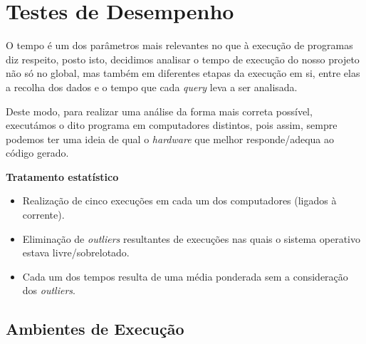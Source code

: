 \documentclass[12pt,a4paper]{report}
\begin{document}
\chapter{Testes de Desempenho}

O tempo é um dos parâmetros mais relevantes no que à execução de programas diz respeito, posto isto, decidimos analisar o tempo de execução do nosso projeto não só no global, mas também em diferentes etapas da execução em si, entre elas a recolha dos dados e o tempo que cada \textit{query} leva a ser analisada.

Deste modo, para realizar uma análise da forma mais correta possível, executámos o dito programa em computadores distintos, pois assim, sempre podemos ter uma ideia de qual o \textit{hardware} que melhor responde/adequa ao código gerado.


\normalsize\textbf{Tratamento estatístico}

\begin{itemize}
    
    \item Realização de cinco execuções em cada um dos computadores (ligados à corrente).
    
    \item Eliminação de \textit{outliers} resultantes de execuções nas quais o sistema operativo estava livre/sobrelotado.

    \item Cada um dos tempos resulta de uma média ponderada sem a consideração dos \textit{outliers}. 
\end{itemize}


\section{Ambientes de Execução}
\end{document}
